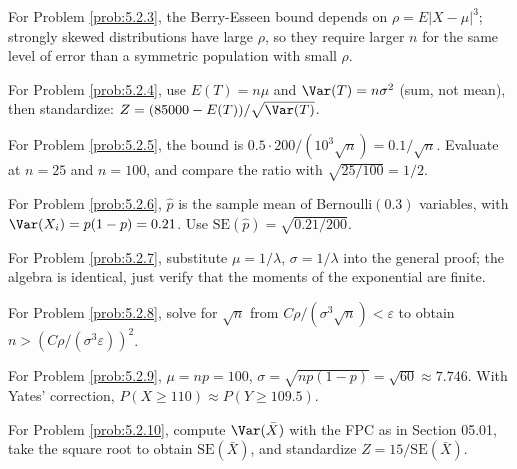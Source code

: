\begin{sugerencia}
	\label{sug:5.2.3}
	For Problem \ref{prob:5.2.3}, the Berry-Esseen bound depends on $\rho=E|X-\mu|^3$; strongly skewed distributions have large $\rho$, so they require larger $n$ for the same level of error than a symmetric population with small $\rho$.
\end{sugerencia}

\begin{sugerencia}
	\label{sug:5.2.4}
	For Problem \ref{prob:5.2.4}, use $E(T)=n\mu$ and $\Var(T)=n\sigma^2$ (sum, not mean), then standardize: $Z=(85000-E(T))/\sqrt{\Var(T)}$.
\end{sugerencia}

\begin{sugerencia}
	\label{sug:5.2.5}
	For Problem \ref{prob:5.2.5}, the bound is $0.5\cdot 200/(10^3\sqrt n) = 0.1/\sqrt n$. Evaluate at $n=25$ and $n=100$, and compare the ratio with $\sqrt{25/100}=1/2$.
\end{sugerencia}

\begin{sugerencia}
	\label{sug:5.2.6}
	For Problem \ref{prob:5.2.6}, $\hat p$ is the sample mean of Bernoulli$(0.3)$ variables, with $\Var(X_i)=p(1-p)=0.21$. Use $\text{SE}(\hat p)=\sqrt{0.21/200}$.
\end{sugerencia}

\begin{sugerencia}
	\label{sug:5.2.7}
	For Problem \ref{prob:5.2.7}, substitute $\mu=1/\lambda$, $\sigma=1/\lambda$ into the general proof; the algebra is identical, just verify that the moments of the exponential are finite.
\end{sugerencia}

\begin{sugerencia}
	\label{sug:5.2.8}
	For Problem \ref{prob:5.2.8}, solve for $\sqrt n$ from $C\rho/(\sigma^3\sqrt n) < \varepsilon$ to obtain $n > (C\rho/(\sigma^3\varepsilon))^2$.
\end{sugerencia}

\begin{sugerencia}
	\label{sug:5.2.9}
	For Problem \ref{prob:5.2.9}, $\mu=np=100$, $\sigma=\sqrt{np(1-p)}=\sqrt{60}\approx 7.746$. With Yates' correction, $P(X\ge 110)\approx P(Y\ge 109.5)$.
\end{sugerencia}

\begin{sugerencia}
	\label{sug:5.2.10}
	For Problem \ref{prob:5.2.10}, compute $\Var(\bar X)$ with the FPC as in Section 05.01, take the square root to obtain $\text{SE}(\bar X)$, and standardize $Z=15/\text{SE}(\bar X)$.
\end{sugerencia}


